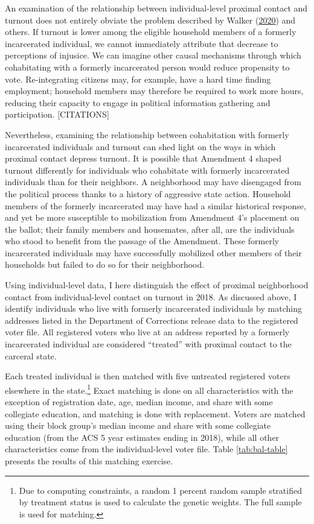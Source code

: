 \documentclass[
  12pt,
]{article}
\begin{document}
An examination of the relationship between individual-level proximal contact and turnout does not entirely obviate the problem described by Walker (\protect\hyperlink{ref-Walker2020}{2020}) and others. If turnout is lower among the eligible household members of a formerly incarcerated individual, we cannot immediately attribute that decrease to perceptions of injusice. We can imagine other causal mechanisms through which cohabitating with a formerly incarcerated person would reduce propensity to vote. Re-integrating citizens may, for example, have a hard time finding employment; household members may therefore be required to work more hours, reducing their capacity to engage in political information gathering and participation. {[}CITATIONS{]}

Nevertheless, examining the relationship between cohabitation with formerly incarcerated individuals and turnout can shed light on the ways in which proximal contact depress turnout. It is possible that Amendment 4 shaped turnout differently for individuals who cohabitate with formerly incarcerated individuals than for their neighbors. A neighborhood may have disengaged from the political process thanks to a history of aggressive state action. Household members of the formerly incarcerated may have had a similar historical response, and yet be more susceptible to mobilization from Amendment 4's placement on the ballot; their family members and housemates, after all, are the individuals who stood to benefit from the passage of the Amendment. These formerly incarcerated individuals may have successfully mobilized other members of their households but failed to do so for their neighborhood.

Using individual-level data, I here distinguish the effect of proximal neighborhood contact from individual-level contact on turnout in 2018. As discussed above, I identify individuals who live with formerly incarcerated individuals by matching addresses listed in the Department of Corrections release data to the registered voter file. All registered voters who live at an address reported by a formerly incarcerated individual are considered ``treated'' with proximal contact to the carceral state.

Each treated individual is then matched with five untreated registered voters elsewhere in the state.\footnote{Due to computing constraints, a random 1 percent random sample stratified by treatment status is used to calculate the genetic weights. The full sample is used for matching.} Exact matching is done on all characteristics with the exception of registration date, age, median income, and share with some collegiate education, and matching is done with replacement. Voters are matched using their block group's median income and share with some collegiate education (from the ACS 5 year estimates ending in 2018), while all other characteristics come from the individual-level voter file. Table \ref{tab:bal-table} presents the results of this matching exercise.
\end{document}

